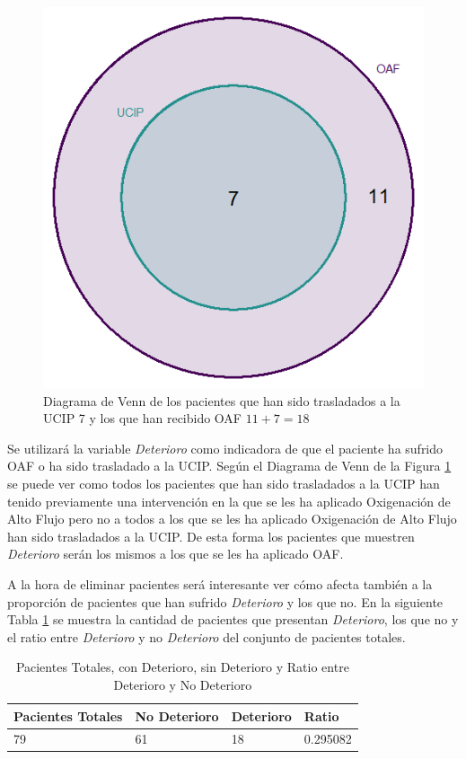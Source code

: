 \begin{figure}[H]
    \centering
    \includegraphics[scale = 1.50]{./img/venn-diagram-OAF-UCIP.png}
    \caption{Diagrama de Venn de los pacientes que han sido trasladados a la UCIP 7 y los que han recibido OAF $11 + 7 = 18$}
    \label{fig:venn-OAF-UCIP}
\end{figure}


Se utilizará la variable \textit{Deterioro} como indicadora de que el paciente ha sufrido OAF o ha sido trasladado a la UCIP. Según el Diagrama de Venn de la Figura \ref{fig:venn-OAF-UCIP} se puede ver como todos los pacientes que han sido trasladados a la UCIP han tenido previamente una intervención en la que se les ha aplicado Oxigenación de Alto Flujo pero no a todos a los que se les ha aplicado Oxigenación de Alto Flujo han sido trasladados a la UCIP. De esta forma los pacientes que muestren \textit{Deterioro} serán los mismos a los que se les ha aplicado OAF.


A la hora de eliminar pacientes será interesante ver cómo afecta también a la proporción de pacientes que han sufrido \textit{Deterioro} y los que no. En la siguiente Tabla \ref{tabla:ratio-deterioro} se muestra la cantidad de pacientes que presentan \textit{Deterioro}, los que no y el ratio entre \textit{Deterioro} y no \textit{Deterioro} del conjunto de pacientes totales.


\begin{table}[H]
    \centering
    \begin{tabular}{|m{2cm}|m{2.25cm}|m{2cm}|m{2cm}|}
    \hline
        Pacientes Totales & No Deterioro & Deterioro & Ratio \\ \hline
        79 & 61 & 18 & 0.295082 \\ \hline
    \end{tabular}
    \caption{Pacientes Totales, con Deterioro, sin Deterioro y Ratio entre Deterioro y No Deterioro}
        \label{tabla:ratio-deterioro}
\end{table}

